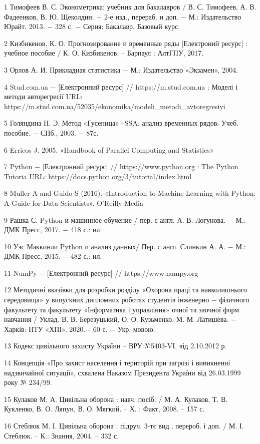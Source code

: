 
\hspace*{26pt} 1 Тимофеев В. С. Эконометрика: учебник для бакалавров / В. С. Тимофеев, А. В. Фадеенков, В. Ю. Щеколдин. $-$ 2-е изд., перераб. и доп. $-$ М.: Издательство Юрайт, 2013. $-$ 328 с. $-$ Серия: Бакалавр. Базовый курс.

2 Кизбикенов, К. О. Прогнозирование и временные ряды [Електроний ресурс] : учебное пособие / К. О. Кизбикенов. $–$ Барнаул : АлтГПУ, 2017.

3 Орлов А. И. Прикладная статистика $-$ М.: Издательство «Экзамен», 2004.

4 Stud.com.ua $-$ [Електронний ресурс] // https://m.stud.com.ua : Моделі і методи авторегресії URL: https://m.stud.com.ua/52035/ekonomika/modeli\_metodi\_avtoregresiyi

5 Голяндина Н. Э. Метод «Гусеница»$-$SSA: анализ временных рядов: Учеб. пособие. $-$ СПб., 2003. $-$ 87с.

6 Erricos J. 2005. «Handbook of Parallel Computing and Statistics»

7 Python $-$ [Електронний ресурс] // https://www.python.org :  The Python Tutoria URL: https://docs.python.org/3/tutorial/index.html

8 Muller A and Guido S (2016). «Introduction to Machine Learning with Python: A Guide for Data Scientists». O'Reilly Media

9 Рашка С. Python и машинное обучение / пер. с англ. А. В. Логунова. $-$ М.: ДМК Пресс, 2017. $-$ 418 с.: ил.

10 Уэс Маккинли Python и анализ данных/ Пер. с англ. Слинкин А. А. $-$ М.: ДМК Пресс, 2015. $-$ 482 с.: ил. 

11 NumPy $-$ [Електронний ресурс] // https://www.numpy.org

12 Методичні вказівки для розробки розділу «Охорона праці та навколишнього середовища» у випускних дипломних роботах студентів інженерно $-$ фізичного факультету та факультету «Інформатика і управління» очної та заочної форм навчання / Уклад. В. В. Березуцький, О. О. Кузьменко, М. М. Латишева. $-$ Харків: НТУ «ХПІ», 2020.$-$ 60 с. $-$ Укр. мовою.

13 Кодекс цивільного захисту України – ВРУ №5403-VI, від 2.10.2012 р.

14 Концепція «Про захист населення і територій при загрозі і виникненні надзвичайної ситуації», схвалена Наказом Президента України від 26.03.1999 року № 234/99.

15 Кулаков М. А. Цивільна оборона : навч. посіб. / М. А. Кулаков, Т. В. Кукленко, В. О. Ляпун, В. О. Мягкий. – Х. : Факт, 2008. – 157 с.

16 Стеблюк М. І. Цивільна оборона  : підруч. 3-тє вид., перероб. і доп. / М. І. Стеблюк. – К.: Знання, 2004. – 332 с.
